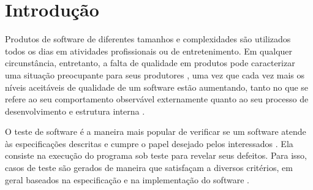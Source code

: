 \documentclass[
	12pt,				%
	oneside,			%
	a4paper,			%
	english,			%
	brazil				%
	]{abntex2ppgsi}
\begin{document}

\tableofcontents*
\cleardoublepage



\textual



% 
%
%
\chapter{Introdução}
\label{chap:introducao}
Produtos de software de diferentes tamanhos e complexidades são utilizados todos os dias em atividades profissionais ou de entretenimento. Em qualquer circunstância, entretanto, a falta de qualidade em produtos pode caracterizar uma situação preocupante para seus produtores \cite{hilburn2002software}  \cite{binder1994test}, uma vez que cada vez mais os níveis aceitáveis de qualidade de um software estão aumentando, tanto no que se refere ao seu comportamento observável externamente quanto ao seu processo de desenvolvimento e estrutura interna \cite{linda2006quality} \cite{bashir2008test} \cite{graham2008foundations}.


O teste de software \cite{tahir2014test} é a maneira mais popular de verificar se um software atende às especificações descritas e cumpre o papel desejado pelos interessados \cite{sommerville2008engenharia}. Ela consiste na execução do programa sob teste para revelar seus defeitos. Para isso, casos de teste são gerados de maneira que satisfaçam a diversos critérios, em geral baseados na especificação e na implementação do software \cite{pezze2008software}. 
\end{document}
